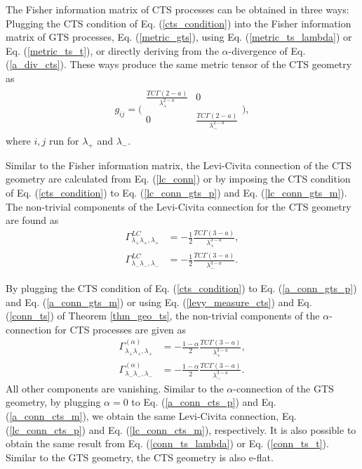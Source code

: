 \documentclass[preprint,11pt]{amsart}
\begin{document}
	The Fisher information matrix of CTS processes can be obtained in three ways: Plugging the CTS condition of Eq. (\ref{cts_condition}) into the Fisher information matrix of GTS processes, Eq. (\ref{metric_gts}), using Eq. (\ref{metric_ts_lambda}) or Eq. (\ref{metric_ts_t}), or directly deriving from the $\alpha$-divergence of Eq. (\ref{a_div_cts}). These ways produce the same metric tensor of the CTS geometry as
	\begin{align}
	\label{metric_cts}
		g_{ij}=\Bigg(
		\begin{array}{cc}
			\frac{TC\Gamma(2-a)}{\lambda_+^{2-a}} &0 \\ 
			0 & \frac{TC\Gamma(2-a)}{\lambda_-^{2-a}}
		\end{array}\Bigg),
	\end{align}
	where $i,j$ run for $\lambda_+$ and $\lambda_-$. 
	
	Similar to the Fisher information matrix, the Levi-Civita connection of the CTS geometry are calculated from Eq. (\ref{lc_conn}) or by imposing the CTS condition of Eq. (\ref{cts_condition}) to Eq. (\ref{lc_conn_gts_p}) and Eq. (\ref{lc_conn_gts_m}). The non-trivial components of the Levi-Civita connection for the CTS geometry are found as
	\begin{align}
	\label{lc_conn_cts_p}
	\Gamma^{LC}_{\lambda_+\lambda_+,\lambda_+}&=-\frac{1}{2}\frac{TC\Gamma(3-a)}{\lambda_+^{3-a}},\\
	\label{lc_conn_cts_m}
	\Gamma^{LC}_{\lambda_-\lambda_-,\lambda_-}&=-\frac{1}{2}\frac{TC\Gamma(3-a)}{\lambda_-^{3-a}}.
	\end{align}
		
	By plugging the CTS condition of Eq. (\ref{cts_condition}) to Eq. (\ref{a_conn_gts_p}) and Eq. (\ref{a_conn_gts_m}) or using Eq. (\ref{levy_measure_cts}) and Eq. (\ref{conn_ts}) of Theorem \ref{thm_geo_ts}, the non-trivial components of the $\alpha$-connection for CTS processes are given as
	\begin{align}
	\label{a_conn_cts_p}
	\Gamma^{(\alpha)}_{\lambda_+\lambda_+,\lambda_+}&=
	-\frac{1-\alpha}{2}\frac{TC\Gamma(3-a)}{ \lambda_+^{3-a}},\\
	\label{a_conn_cts_m}
	\Gamma^{(\alpha)}_{\lambda_-\lambda_-,\lambda_-}&=
	-\frac{1-\alpha}{2}\frac{TC\Gamma(3-a)}{ \lambda_-^{3-a}}.
	\end{align}
	All other components are vanishing. Similar to the $\alpha$-connection of the GTS geometry, by plugging $\alpha=0$ to Eq. (\ref{a_conn_cts_p}) and Eq. (\ref{a_conn_cts_m}), we obtain the same Levi-Civita connection, Eq. (\ref{lc_conn_cts_p}) and Eq. (\ref{lc_conn_cts_m}), respectively. It is also possible to obtain the same result from Eq. (\ref{conn_ts_lambda}) or Eq. (\ref{conn_ts_t}). Similar to the GTS geometry, the CTS geometry is also e-flat.
\end{document}
